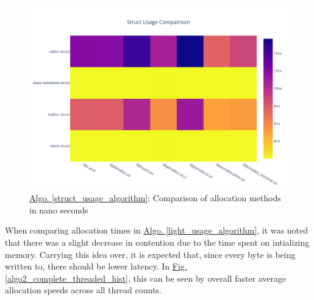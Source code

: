 \documentclass[letterpaper, 10 pt, conference]{ieeeconf}  %
\newcommand*\todo[0]{\textcolor{red}{TODO }}
\begin{document}
\begin{figure}[tbh!]
  \centering
  \includegraphics[width=\columnwidth]{graphs/struct_hist.png}
  \caption{ \hyperref[struct_usage_algorithm]{Algo. \ref*{struct_usage_algorithm}}: Comparison of allocation methods in nano seconds }
  \label{algo2_complete_hist}
\end{figure} 






When comparing allocation times in \hyperref[light_usage_algorithm]{Algo. \ref{light_usage_algorithm}}, it was noted that there was a slight decrease in contention due to the time spent on intializing memory.
Carrying this idea over, it is expected that, since every byte is being written to, there should be lower latency.
In \hyperref[algo2_complete_threaded_hist]{Fig. \ref{algo2_complete_threaded_hist}}, this can be seen by overall faster average allocation speeds across all thread counts.
\end{document}
